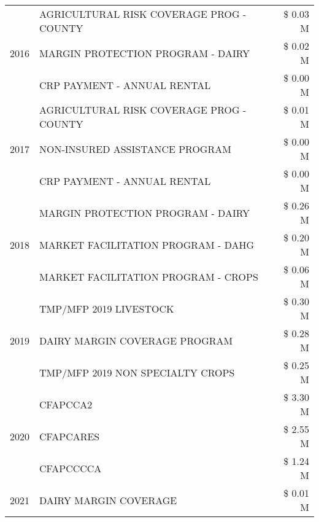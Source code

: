\begin{tabular}{llr}
\multirow[t]{3}{*}{2016} & AGRICULTURAL RISK COVERAGE PROG - COUNTY & \$ 0.03 M \\
 & MARGIN PROTECTION PROGRAM - DAIRY & \$ 0.02 M \\
 & CRP PAYMENT - ANNUAL RENTAL & \$ 0.00 M \\
\cline{1-3}
\multirow[t]{3}{*}{2017} & AGRICULTURAL RISK COVERAGE PROG - COUNTY & \$ 0.01 M \\
 & NON-INSURED ASSISTANCE PROGRAM & \$ 0.00 M \\
 & CRP PAYMENT - ANNUAL RENTAL & \$ 0.00 M \\
\cline{1-3}
\multirow[t]{3}{*}{2018} & MARGIN PROTECTION PROGRAM - DAIRY & \$ 0.26 M \\
 & MARKET FACILITATION PROGRAM - DAHG & \$ 0.20 M \\
 & MARKET FACILITATION PROGRAM - CROPS & \$ 0.06 M \\
\cline{1-3}
\multirow[t]{3}{*}{2019} & TMP/MFP 2019 LIVESTOCK & \$ 0.30 M \\
 & DAIRY MARGIN COVERAGE PROGRAM & \$ 0.28 M \\
 & TMP/MFP 2019 NON SPECIALTY CROPS & \$ 0.25 M \\
\cline{1-3}
\multirow[t]{3}{*}{2020} & CFAPCCA2 & \$ 3.30 M \\
 & CFAPCARES & \$ 2.55 M \\
 & CFAPCCCCA & \$ 1.24 M \\
\cline{1-3}
2021 & DAIRY MARGIN COVERAGE & \$ 0.01 M \\
\cline{1-3}
\bottomrule
\end{tabular}
